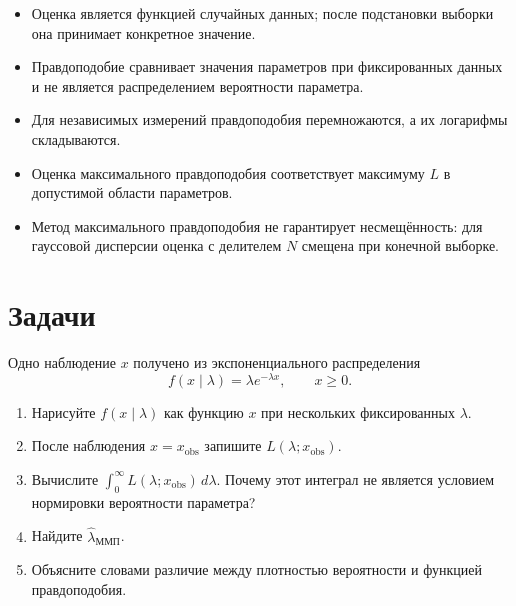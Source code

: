 \documentclass[
  russian,
  11pt,
  a4paper,
  open=any]{scrbook}
\providecommand{\tightlist}{%
  \setlength{\itemsep}{0pt}\setlength{\parskip}{0pt}}
\begin{document}
\begin{bookchaptersummary}

\begin{itemize}
\tightlist
\item
  Оценка является функцией случайных данных; после подстановки выборки
  она принимает конкретное значение.
\item
  Правдоподобие сравнивает значения параметров при фиксированных данных
  и не является распределением вероятности параметра.
\item
  Для независимых измерений правдоподобия перемножаются, а их логарифмы
  складываются.
\item
  Оценка максимального правдоподобия соответствует максимуму \(L\) в
  допустимой области параметров.
\item
  Метод максимального правдоподобия не гарантирует несмещённость: для
  гауссовой дисперсии оценка с делителем \(N\) смещена при конечной
  выборке.
\end{itemize}

\end{bookchaptersummary}

\section{Задачи}\label{ux437ux430ux434ux430ux447ux438-8}

\begin{semanticpdfbox}[colback=BookCoralSoft,borderline west={1.2mm}{0pt}{BookCoral}]

\par\nopagebreak[4]\vspace{1.2mm}

Одно наблюдение \(x\) получено из экспоненциального распределения \[
f(x\mid\lambda)=\lambda e^{-\lambda x},
\qquad x\ge0.
\]

\begin{enumerate}
\def\labelenumi{\arabic{enumi}.}
\tightlist
\item
  Нарисуйте \(f(x\mid\lambda)\) как функцию \(x\) при нескольких
  фиксированных \(\lambda\).
\item
  После наблюдения \(x=x_{\mathrm{obs}}\) запишите
  \(L(\lambda;x_{\mathrm{obs}})\).
\item
  Вычислите \(\int_0^\infty L(\lambda;x_{\mathrm{obs}})\,d\lambda\).
  Почему этот интеграл не является условием нормировки вероятности
  параметра?
\item
  Найдите \(\widehat\lambda_{\mathrm{ММП}}\).
\item
  Объясните словами различие между плотностью вероятности и функцией
  правдоподобия.
\end{enumerate}

\end{semanticpdfbox}
\end{document}
